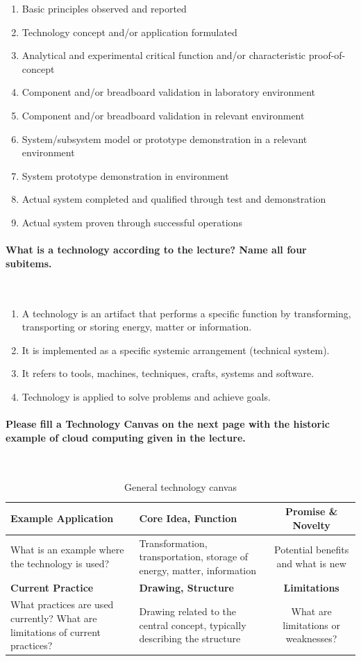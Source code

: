 \documentclass[10pt,a4paper,noendnumber=true]{scrartcl}
\newcommand{\properparagraph}[1]{\paragraph{\textcolor{Emerald}{#1}}\mbox{}\\}
\begin{document}
\begin{enumerate}
	\item Basic principles observed and reported
	\item Technology concept and/or application formulated
	\item Analytical and experimental critical function and/or characteristic proof-of-concept
	\item Component and/or breadboard validation in laboratory environment
	\item Component and/or breadboard validation in relevant environment
	\item System/subsystem model or prototype demonstration in a relevant environment
	\item System prototype demonstration in environment
	\item Actual system completed and qualified through test and demonstration
	\item Actual system proven through successful operations 
\end{enumerate}
\properparagraph{What is a technology according to the lecture? Name all four subitems.}
\begin{enumerate}
	\item A technology is an artifact that performs a specific function by transforming, transporting or storing energy, matter or information.
	\item It is implemented as a specific systemic arrangement (technical system).
	\item It refers to tools, machines, techniques, crafts, systems and software.
	\item Technology is applied to solve problems and achieve goals.
\end{enumerate}
\properparagraph{Please fill a Technology Canvas on the next page with the historic example of cloud computing given in the lecture.}

\begin{table}[tbh!]
		\centering
		\caption{General technology canvas}
		\begin{tabularx}{\textwidth}{XXc}
			\toprule
			\textbf{Example Application} & \textbf{Core Idea, Function} & \textbf{Promise \& Novelty} \\
			\midrule
			What is an example where the technology is used? & Transformation, transportation, storage of energy, matter, information & Potential benefits and what is new \\
			\midrule
			\textbf{Current Practice} & \textbf{Drawing, Structure} & \textbf{Limitations} \\
			\midrule
			What practices are used currently? What are limitations of current practices? & Drawing related to the central concept, typically describing the structure & What are limitations or weaknesses? \\
			\bottomrule
		\end{tabularx}
\end{table}
\end{document}
